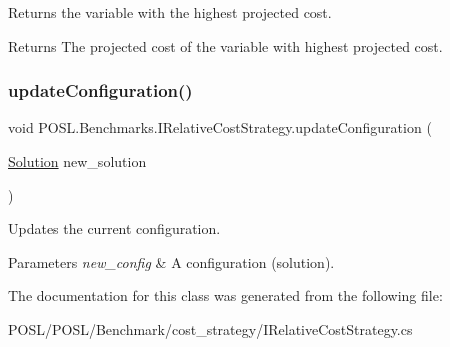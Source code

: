 Returns the variable with the highest projected cost. 

\begin{DoxyReturn}{Returns}
The projected cost of the variable with highest projected cost. 
\end{DoxyReturn}
\mbox{\label{interfacePOSL_1_1Benchmarks_1_1IRelativeCostStrategy_a74e16251c8b6304dec763e640e19f1df}} 
\subsubsection{\texorpdfstring{update\+Configuration()}{updateConfiguration()}}
{\footnotesize\ttfamily void P\+O\+S\+L.\+Benchmarks.\+I\+Relative\+Cost\+Strategy.\+update\+Configuration (\begin{DoxyParamCaption}\item[{\hyperlink{classPOSL_1_1Data_1_1Solution}{Solution}}]{new\+\_\+solution }\end{DoxyParamCaption})}



Updates the current configuration. 


\begin{DoxyParams}{Parameters}
{\em new\+\_\+config} & A configuration (solution). \\
\hline
\end{DoxyParams}


The documentation for this class was generated from the following file\+:\begin{DoxyCompactItemize}
\item 
P\+O\+S\+L/\+P\+O\+S\+L/\+Benchmark/cost\+\_\+strategy/I\+Relative\+Cost\+Strategy.\+cs\end{DoxyCompactItemize}
